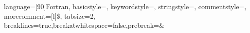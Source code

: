     {language=[90]Fortran,
    basicstyle=\ttfamily\footnotesize,
    keywordstyle=\color{blue}\ttfamily,
    stringstyle=\color{brown}\ttfamily,
    commentstyle=\color{red}\ttfamily,
    morecomment=[l]{\$},
    tabsize=2,
    breaklines=true,breakatwhitespace=false,prebreak=\space\&
  }


\usepackage{graphicx}
\usepackage{subfig}


\usepackage{xmpmulti}

\usepackage{notacion}


\usepackage{pdfpages}

\usepackage{multimedia}

\usepackage{array}  %

\setlength{\tabcolsep}{10pt}
\renewcommand{\arraystretch}{1.5}


\newcommand{\vbs}{\vspace{\baselineskip}}
\newcommand{\vbss}{\vspace{0.5\baselineskip}}
\newcommand{\vbsf}{\vspace*{\baselineskip}}
\newcommand{\vbssf}{\vspace*{0.5\baselineskip}}
\newcommand{\FIGURA}[1]{\vspace*{2\baselineskip} \centering{FIGURA \\ #1} \vspace*{2\baselineskip} }


\newcommand{\crule}{{\color{cyan} \hrule} }

\setcounter{tocdepth}{4}


\newcommand{\seti}{\setcounter{saveenumi}{\value{enumi}}}
\newcommand{\conti}{\setcounter{enumi}{\value{saveenumi}}}



